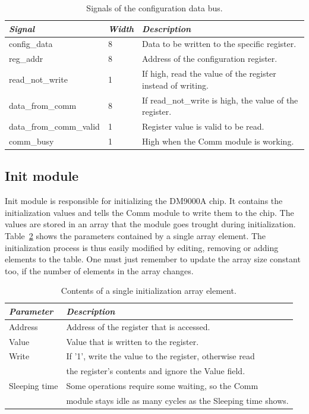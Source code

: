 \documentclass{article}
\begin{document}
\begin{table}[hb]
  \begin{tabular}{|l|l|l|}
    \hline
    \textit{Signal} & \textit{Width} & \textit{Description} \\
    \hline
    config\_data & 8 & Data to be written to the specific register. \\
    reg\_addr & 8 & Address of the configuration register. \\
    read\_not\_write & 1 & If high, read the value of the register instead of writing. \\
    data\_from\_comm & 8 & If read\_not\_write is high, the value of the register. \\
    data\_from\_comm\_valid & 1 & Register value is valid to be read. \\
    comm\_busy & 1 & High when the Comm module is working. \\
    \hline
  \end{tabular}
  \caption{Signals of the configuration data bus.}
  \label{tab:confDataBus}
\end{table}


\subsection{Init module}

Init module is responsible for initializing the DM9000A chip. It
contains the initialization values and tells the Comm module to write
them to the chip. The values are stored in an array that the module
goes trought during initialization. Table~\ref{tab:initValues} shows
the parameters contained by a single array element. The initialization
process is thus easily modified by editing, removing or adding elements
to the table. One must just remember to update the array size constant
too, if the number of elements in the array changes.

\begin{table}[hbt]
  \begin{tabular}{|l|l|}
    \hline
    \textit{Parameter} & \textit{Description}\\
    \hline
    Address & Address of the register that is accessed.\\
    Value & Value that is written to the register.\\
    Write & If '1', write the value to the register, otherwise read\\
    & the register's contents and ignore the Value field.\\
    Sleeping time & Some operations require some waiting, so the Comm\\
    & module stays idle as many cycles as the Sleeping time shows.\\
    \hline
  \end{tabular}
  \caption{Contents of a single initialization array element.}
  \label{tab:initValues}
\end{table}
\end{document}
